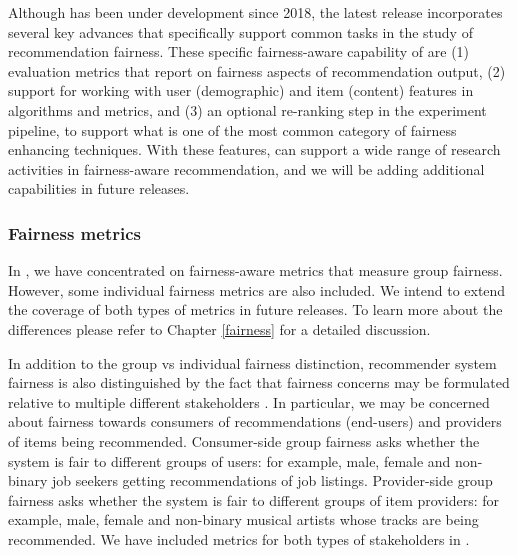 Although \libauto{} has been under development since 2018, the latest release incorporates several key advances that specifically support common tasks in the study of recommendation fairness. These specific fairness-aware capability of \libauto{} are (1) evaluation metrics that report on fairness aspects of recommendation output, (2) support for working with user (demographic) and item (content) features in algorithms and metrics, and (3) an optional re-ranking step in the experiment pipeline, to support what is one of the most common category of fairness enhancing techniques.
With these features, \libauto{} can support a wide range of research activities in fairness-aware recommendation, and we will be adding additional capabilities in future releases.


\subsubsection{Fairness metrics}
\label{subsubsec:libauto_fairmetrics}



In \libauto{}, we have concentrated on fairness-aware metrics that measure group fairness. However, some individual fairness metrics are also included. We intend to extend the coverage of both types of metrics in future releases. To learn more about the differences please refer to Chapter \ref{fairness} for a detailed discussion.

In addition to the group vs individual fairness distinction, recommender system fairness is also distinguished by the fact that fairness concerns may be formulated relative to multiple different stakeholders \cite{burke2017multisided,abdollahpouri2020multistakeholder}. In particular, we may be concerned about fairness towards consumers of recommendations (end-users) and providers of items being recommended. Consumer-side group fairness asks whether the system is fair to different groups of users: for example, male, female and non-binary job seekers getting recommendations of job listings. Provider-side group fairness asks whether the system is fair to different groups of item providers: for example, male, female and non-binary musical artists whose tracks are being recommended. We have included metrics for both types of stakeholders in \libauto{}.

